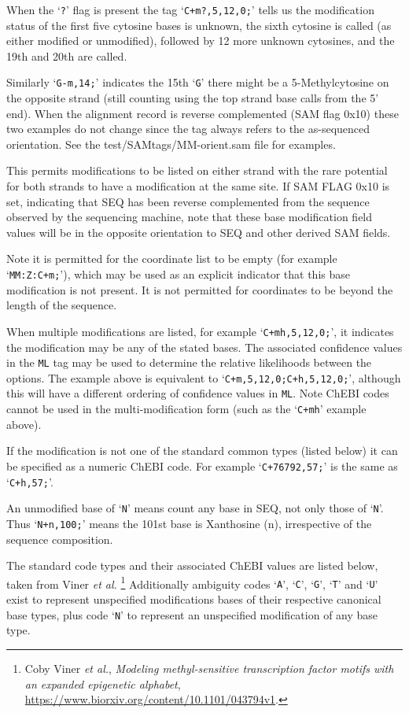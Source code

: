 \documentclass[10pt]{article}
\begin{document}
\begin{description}
When the `{\tt ?}' flag is present the tag `{\tt C+m?,5,12,0;}' tells us the modification status of the first five 
cytosine bases is unknown, the sixth cytosine is called (as either modified or unmodified), followed by 12 more unknown cytosines, and the 19th and 20th are called.

Similarly `{\tt G-m,14;}' indicates the 15th `{\tt G}' there might be a 5-Methylcytosine on the opposite strand (still counting using the top strand base calls from the 5' end).
When the alignment record is reverse complemented (SAM flag 0x10) these two examples do not change since the tag always refers to the as-sequenced orientation.
See the test/SAMtags/MM-orient.sam file for examples.

This permits modifications to be listed on either strand with the rare potential for both strands to have a modification at the same site.
If SAM FLAG 0x10 is set, indicating that SEQ has been reverse complemented from the sequence observed by the sequencing machine, note that these base modification field values will be in the opposite orientation to SEQ and other derived SAM fields.

Note it is permitted for the coordinate list to be empty (for example `{\tt MM:Z:C+m;}'), which may be used as an explicit indicator that this base modification is not present.
It is not permitted for coordinates to be beyond the length of the sequence.

When multiple modifications are listed, for example `{\tt C+mh,5,12,0;}', it indicates the modification may be any of the stated bases.
The associated confidence values in the {\tt ML} tag may be used to determine the relative likelihoods between the options.
The example above is equivalent to `{\tt C+m,5,12,0;C+h,5,12,0;}', although this will have a different ordering of confidence values in {\tt ML}.
Note ChEBI codes cannot be used in the multi-modification form (such as the `{\tt C+mh}' example above).

If the modification is not one of the standard common types (listed below) it can be specified as a numeric ChEBI code.
For example `{\tt C+76792,57;}' is the same as `{\tt C+h,57;}'.

An unmodified base of `{\tt N}' means count any base in {\sf SEQ}, not only those of `{\tt N}'.
Thus `{\tt N+n,100;}' means the 101st base is Xanthosine (n), irrespective of the sequence composition.

The standard code types and their associated ChEBI values are listed
below, taken from Viner {\it et al.}%
\footnote{Coby Viner {\it et al.}, \emph{Modeling methyl-sensitive
transcription factor motifs with an expanded epigenetic alphabet}, \url{https://www.biorxiv.org/content/10.1101/043794v1}.}
Additionally ambiguity codes `{\tt A}', `{\tt C}', `{\tt G}', `{\tt T}' and `{\tt U}'
exist to represent unspecified modifications bases of their respective
canonical base types, plus code `{\tt N}' to represent an unspecified
modification of any base type.


\end{description}
\end{document}
